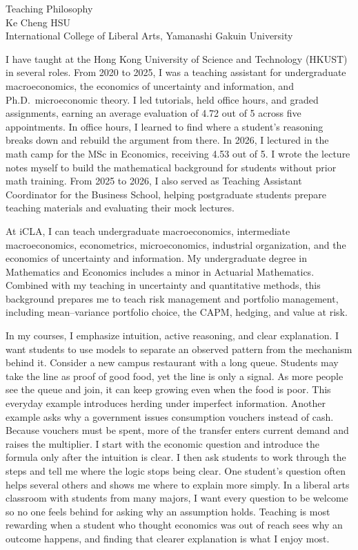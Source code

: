 \documentclass[11pt]{article}
\begin{document}
\begin{center}
{\Large Teaching Philosophy}\\[0.4em]
Ke Cheng HSU\\
International College of Liberal Arts, Yamanashi Gakuin University
\end{center}

I have taught at the Hong Kong University of Science and Technology (HKUST) in several roles. From 2020 to 2025, I was a teaching assistant for undergraduate macroeconomics, the economics of uncertainty and information, and Ph.D.\ microeconomic theory. I led tutorials, held office hours, and graded assignments, earning an average evaluation of 4.72 out of 5 across five appointments. In office hours, I learned to find where a student's reasoning breaks down and rebuild the argument from there. In 2026, I lectured in the math camp for the MSc in Economics, receiving 4.53 out of 5. I wrote the lecture notes myself to build the mathematical background for students without prior math training. From 2025 to 2026, I also served as Teaching Assistant Coordinator for the Business School, helping postgraduate students prepare teaching materials and evaluating their mock lectures.

At iCLA, I can teach undergraduate macroeconomics, intermediate macroeconomics, econometrics, microeconomics, industrial organization, and the economics of uncertainty and information. My undergraduate degree in Mathematics and Economics includes a minor in Actuarial Mathematics. Combined with my teaching in uncertainty and quantitative methods, this background prepares me to teach risk management and portfolio management, including mean--variance portfolio choice, the CAPM, hedging, and value at risk.

In my courses, I emphasize intuition, active reasoning, and clear explanation. I want students to use models to separate an observed pattern from the mechanism behind it. Consider a new campus restaurant with a long queue. Students may take the line as proof of good food, yet the line is only a signal. As more people see the queue and join, it can keep growing even when the food is poor. This everyday example introduces herding under imperfect information. Another example asks why a government issues consumption vouchers instead of cash. Because vouchers must be spent, more of the transfer enters current demand and raises the multiplier. I start with the economic question and introduce the formula only after the intuition is clear. I then ask students to work through the steps and tell me where the logic stops being clear. One student's question often helps several others and shows me where to explain more simply. In a liberal arts classroom with students from many majors, I want every question to be welcome so no one feels behind for asking why an assumption holds. Teaching is most rewarding when a student who thought economics was out of reach sees why an outcome happens, and finding that clearer explanation is what I enjoy most.
\end{document}
